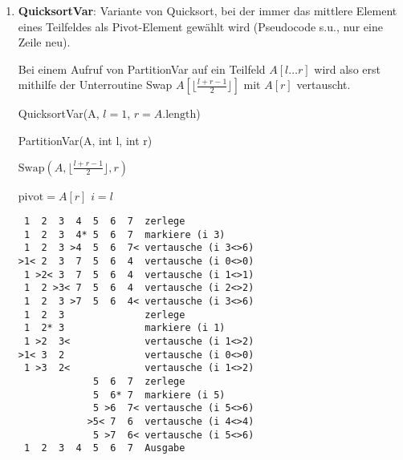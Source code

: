 \documentclass{bschlangaul-aufgabe}
\begin{document}
\begin{enumerate}
\begin{enumerate}

\item \textbf{QuicksortVar}: Variante von Quicksort, bei der immer das
mittlere Element eines Teilfeldes als Pivot-Element gewählt wird
(Pseudocode s.u., nur eine Zeile neu).

Bei einem Aufruf von PartitionVar auf ein Teilfeld $A[l \dots r]$ wird
also erst mithilfe der Unterroutine Swap $A\left[\lfloor \frac{l + r - 1}{2} \rfloor\right]$ mit $A[r]$
vertauscht.

\begin{function}
\caption{QuicksortVar(A, $l = 1$, $r = A.\text{length}$)}

\end{function}

\begin{function}
\caption{PartitionVar(A, int l, int r)}

$\text{Swap}(A, \lfloor \frac{l + r - 1}{2} \rfloor, r)$\;

$\text{pivot} = A[r]$\;
$i = l$\;
\end{function}

\begin{bAntwort}


\begin{verbatim}
 1  2  3  4  5  6  7  zerlege
 1  2  3  4* 5  6  7  markiere (i 3)
 1  2  3 >4  5  6  7< vertausche (i 3<>6)
>1< 2  3  7  5  6  4  vertausche (i 0<>0)
 1 >2< 3  7  5  6  4  vertausche (i 1<>1)
 1  2 >3< 7  5  6  4  vertausche (i 2<>2)
 1  2  3 >7  5  6  4< vertausche (i 3<>6)
 1  2  3              zerlege
 1  2* 3              markiere (i 1)
 1 >2  3<             vertausche (i 1<>2)
>1< 3  2              vertausche (i 0<>0)
 1 >3  2<             vertausche (i 1<>2)
             5  6  7  zerlege
             5  6* 7  markiere (i 5)
             5 >6  7< vertausche (i 5<>6)
            >5< 7  6  vertausche (i 4<>4)
             5 >7  6< vertausche (i 5<>6)
 1  2  3  4  5  6  7  Ausgabe
\end{verbatim}



\end{bAntwort}
\end{enumerate}
\end{enumerate}
\end{document}
